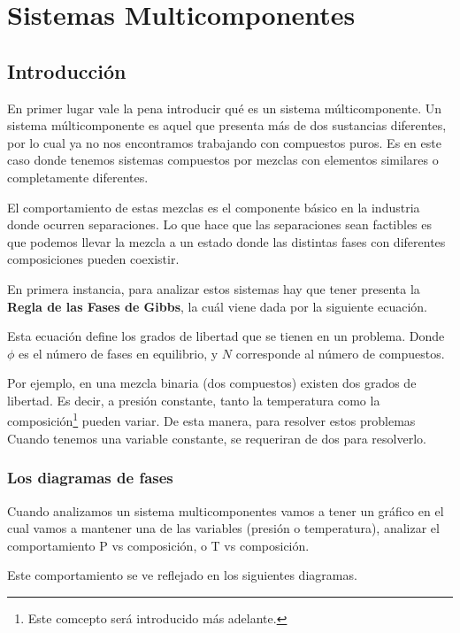 
\section{Sistemas Multicomponentes}

\subsection{Introducción}

En primer lugar vale la pena introducir qué es un sistema múlticomponente. Un sistema múlticomponente es aquel que presenta más de dos sustancias diferentes, por lo cual ya no nos encontramos trabajando con compuestos puros.
Es en este caso donde tenemos sistemas compuestos por mezclas con elementos similares o completamente diferentes.

El comportamiento de estas mezclas es el componente básico en la industria donde ocurren separaciones. Lo que hace que las separaciones sean factibles es que podemos llevar la mezcla a un estado donde las distintas fases con diferentes composiciones pueden coexistir.

En primera instancia, para analizar estos sistemas hay que tener presenta la \textbf{Regla de las Fases de Gibbs}, la cuál viene dada por la siguiente ecuación.


Esta ecuación define los grados de libertad que se tienen en un problema. Donde $\phi$ es el número de fases en equilibrio, y $N$ corresponde al número de compuestos.

Por ejemplo, en una mezcla binaria (dos compuestos) existen dos grados de libertad. Es decir, a presión constante, tanto la temperatura como la composición\footnote{Este comcepto será introducido más adelante.} pueden variar. De esta manera, para resolver estos problemas
Cuando tenemos una variable constante, se requeriran de dos para resolverlo.

\subsubsection{Los diagramas de fases}

Cuando analizamos un sistema multicomponentes vamos a tener un gráfico en el cual vamos a mantener una de las variables (presión o temperatura), analizar el comportamiento P vs composición, o T vs composición. 

Este comportamiento se ve reflejado en los siguientes diagramas.

